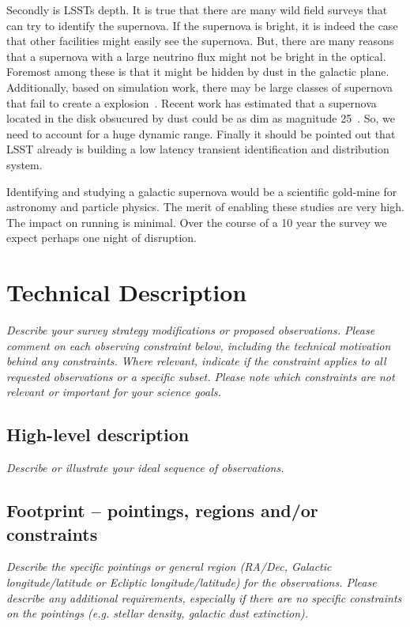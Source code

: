 \documentclass[11pt]{article}
\begin{document}
Secondly is LSSTs depth. It is true that there are many wild field
surveys that can try to identify the supernova.  If the supernova is
bright, it is indeed the case that other facilities might easily see
the supernova.  But, there are many reasons that a supernova with a
large neutrino flux might not be bright in the optical.  Foremost
among these is that it might be hidden by dust in the galactic plane.
Additionally, based on simulation work, there may be large classes of
supernova that fail to create a explosion~\cite{Evanpaper}. Recent
work has estimated that a supernova located in the disk obsucured by
dust could be as dim as magnitude 25~\cite{2016MNRAS.461.3296N}.
So, we need to account for a huge dynamic range.  Finally it should be
pointed out that LSST already is building a low latency transient
identification and distribution system.

Identifying and studying a galactic supernova would be a scientific
gold-mine for astronomy and particle physics.  The merit of enabling
these studies are very high. The impact on running is minimal.  Over
the course of a 10 year the survey we expect perhaps one night of
disruption.

\section{Technical Description}
\begin{footnotesize}
{\it Describe your survey strategy modifications or proposed observations. Please comment on each observing constraint
below, including the technical motivation behind any constraints. Where relevant, indicate
if the constraint applies to all requested observations or a specific subset. Please note which 
constraints are not relevant or important for your science goals.}
\end{footnotesize}



\subsection{High-level description}
\begin{footnotesize}
{\it Describe or illustrate your ideal sequence of observations.}
\end{footnotesize}

\vspace{.3in}


\subsection{Footprint -- pointings, regions and/or constraints}
\begin{footnotesize}{\it Describe the specific pointings or general region (RA/Dec, Galactic longitude/latitude or 
Ecliptic longitude/latitude) for the observations. Please describe any additional requirements, especially if there
are no specific constraints on the pointings (e.g. stellar density, galactic dust extinction).}
\end{footnotesize}
\end{document}
